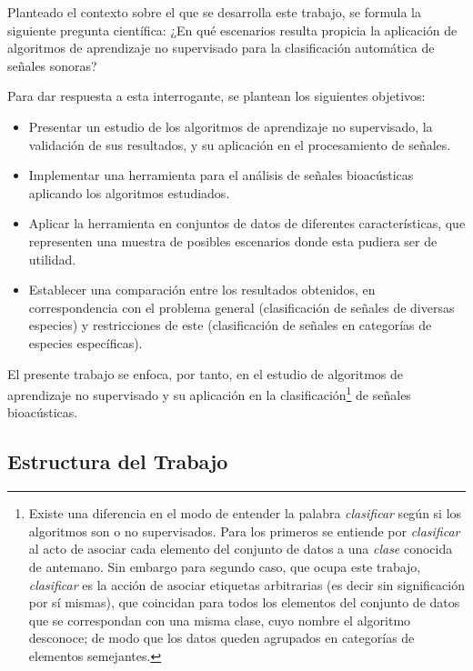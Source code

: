 Planteado el contexto sobre el que se desarrolla este trabajo, se formula la siguiente pregunta científica: ¿En qué escenarios resulta propicia la aplicación de algoritmos de aprendizaje no supervisado para la clasificación automática de señales sonoras?

Para dar respuesta a esta interrogante, se plantean los siguientes objetivos:
\begin{itemize}
    \item Presentar un estudio de los algoritmos de aprendizaje no supervisado, la validación de sus resultados, y su aplicación en el procesamiento de señales.
    \item Implementar una herramienta para el análisis de señales bioacústicas aplicando los algoritmos estudiados.
    \item Aplicar la herramienta en conjuntos de datos de diferentes características, que representen una muestra de posibles escenarios donde esta pudiera ser de utilidad.
    \item Establecer una comparación entre los resultados obtenidos, en correspondencia con el problema general (clasificación de señales de diversas especies) y restricciones de este (clasificación de señales en categorías de especies específicas).
\end{itemize}

El presente trabajo se enfoca, por tanto, en el estudio de algoritmos de aprendizaje no supervisado y su aplicación en la clasificación\footnote{Existe una diferencia en el modo de entender la palabra \textit{clasificar} según si los algoritmos son o no supervisados. Para los primeros se entiende por \textit{clasificar} al acto de asociar cada elemento del conjunto de datos a una \textit{clase} conocida de antemano. Sin embargo para segundo caso, que ocupa este trabajo, \textit{clasificar} es la acción de asociar etiquetas arbitrarias (es decir sin significación por sí mismas), que coincidan para todos los elementos del conjunto de datos que se correspondan con una misma clase, cuyo nombre el algoritmo desconoce; de modo que los datos queden agrupados en categorías de elementos semejantes.} de señales bioacústicas.

\subsection*{Estructura del Trabajo}\label{subsec:estructuraDelTrabajo}

